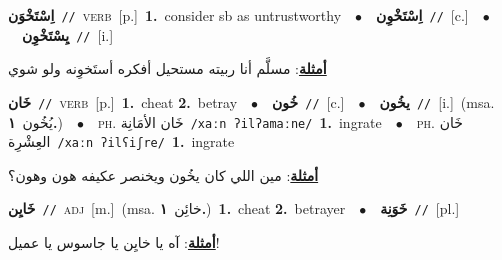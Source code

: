 \documentclass[10pt,a4paper,twoside]{article} %
\begin{document}
\begin{multicols}{2}
{\setlength\topsep{0pt}\textbf{\foreignlanguage{arabic}{اِسْتَخْوَن}}\ {\color{gray}\texttt{//}\color{black}}\ \textsc{verb}\ [p.]\ \textbf{1.}~consider sb as untrustworthy\ \ $\bullet$\ \ \setlength\topsep{0pt}\textbf{\foreignlanguage{arabic}{اِسْتَخْوِن}}\ {\color{gray}\texttt{//}\color{black}}\ [c.]\ \ $\bullet$\ \ \setlength\topsep{0pt}\textbf{\foreignlanguage{arabic}{يِسْتَخْوِن}}\ {\color{gray}\texttt{//}\color{black}}\ [i.]\  \begin{flushright}\color{gray}\foreignlanguage{arabic}{\textbf{\underline{\foreignlanguage{arabic}{أمثلة}}}: مسلَّم أنا ربيته مستحيل أفكره أستَخوِنه ولو شوي}\end{flushright}\color{black}} \vspace{2mm}

{\setlength\topsep{0pt}\textbf{\foreignlanguage{arabic}{خَان}}\ {\color{gray}\texttt{//}\color{black}}\ \textsc{verb}\ [p.]\ \textbf{1.}~cheat  \textbf{2.}~betray\ \ $\bullet$\ \ \setlength\topsep{0pt}\textbf{\foreignlanguage{arabic}{خُون}}\ {\color{gray}\texttt{//}\color{black}}\ [c.]\ \ $\bullet$\ \ \setlength\topsep{0pt}\textbf{\foreignlanguage{arabic}{يخُون}}\ {\color{gray}\texttt{//}\color{black}}\ [i.]\ \color{gray}(msa. \foreignlanguage{arabic}{يُخُون}~\foreignlanguage{arabic}{\textbf{١.}})\color{black}\ \ $\bullet$\ \ \textsc{ph.} \color{gray} \foreignlanguage{arabic}{خَان الأمَانِة}\color{black}\ {\color{gray}\texttt{/{\sffamily xaːn ʔilʔamaːne}/}\color{black}}\ \textbf{1.}~ingrate\ \ $\bullet$\ \ \textsc{ph.} \color{gray} \foreignlanguage{arabic}{خَان العِشْرِة}\color{black}\ {\color{gray}\texttt{/{\sffamily xaːn ʔilʕiʃre}/}\color{black}}\ \textbf{1.}~ingrate\  \begin{flushright}\color{gray}\foreignlanguage{arabic}{\textbf{\underline{\foreignlanguage{arabic}{أمثلة}}}: مين اللي كان يخُون ويخنصر عكيفه هون وهون؟}\end{flushright}\color{black}} \vspace{2mm}

{\setlength\topsep{0pt}\textbf{\foreignlanguage{arabic}{خَايِن}}\ {\color{gray}\texttt{//}\color{black}}\ \textsc{adj}\ [m.]\ \color{gray}(msa. \foreignlanguage{arabic}{خائِن}~\foreignlanguage{arabic}{\textbf{١.}})\color{black}\ \textbf{1.}~cheat  \textbf{2.}~betrayer\ \ $\bullet$\ \ \setlength\topsep{0pt}\textbf{\foreignlanguage{arabic}{خَوَنِة}}\ {\color{gray}\texttt{//}\color{black}}\ [pl.]\  \begin{flushright}\color{gray}\foreignlanguage{arabic}{\textbf{\underline{\foreignlanguage{arabic}{أمثلة}}}: آه يا خايِن يا جاسوس يا عميل!}\end{flushright}\color{black}} \vspace{2mm}


\end{multicols}
\end{document}
